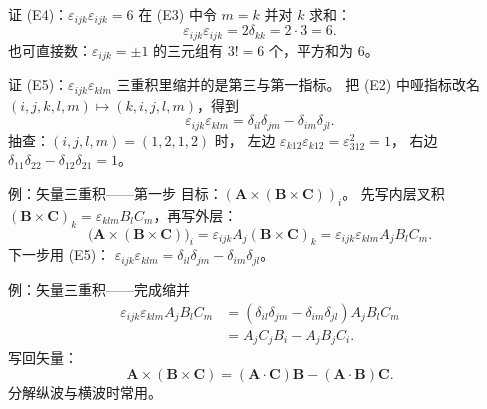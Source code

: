 \documentclass[fontset=windows, chinese, 10pt, xcolor=dvipsnames]{beamer}
\begin{document}
\begin{frame}{证 (E4)：$\varepsilon_{ijk}\varepsilon_{ijk}=6$}
  在 (E3) 中令 $m=k$ 并对 $k$ 求和：
  \begin{equation*}
    \varepsilon_{ijk}\varepsilon_{ijk}
    =2\delta_{kk}
    =2\cdot 3
    =6.
  \end{equation*}
  也可直接数：$\varepsilon_{ijk}=\pm 1$ 的三元组有 $3!=6$ 个，平方和为 $6$。
\end{frame}

\begin{frame}{证 (E5)：$\varepsilon_{ijk}\varepsilon_{klm}$}
  三重积里缩并的是第三与第一指标。
  把 (E2) 中哑指标改名
  $(i,j,k,l,m)\mapsto(k,i,j,l,m)$，得到
  \begin{equation*}
    \varepsilon_{ijk}\varepsilon_{klm}
    =\delta_{il}\delta_{jm}-\delta_{im}\delta_{jl}.
  \end{equation*}
  抽查：$(i,j,l,m)=(1,2,1,2)$ 时，
  左边 $\varepsilon_{k12}\varepsilon_{k12}=\varepsilon_{312}^2=1$，
  右边 $\delta_{11}\delta_{22}-\delta_{12}\delta_{21}=1$。
\end{frame}

\begin{frame}{例：矢量三重积——第一步}
  目标：$(\mathbf{A}\times(\mathbf{B}\times\mathbf{C}))_i$。
  先写内层叉积 $(\mathbf{B}\times\mathbf{C})_k=\varepsilon_{klm}B_l C_m$，再写外层：
  \begin{equation*}
    \bigl(\mathbf{A}\times(\mathbf{B}\times\mathbf{C})\bigr)_i
    =\varepsilon_{ijk}A_j(\mathbf{B}\times\mathbf{C})_k
    =\varepsilon_{ijk}\varepsilon_{klm}A_j B_l C_m.
  \end{equation*}
  下一步用 (E5)：
  $\varepsilon_{ijk}\varepsilon_{klm}=\delta_{il}\delta_{jm}-\delta_{im}\delta_{jl}$。
\end{frame}

\begin{frame}{例：矢量三重积——完成缩并}
  \begin{align*}
    \varepsilon_{ijk}\varepsilon_{klm}A_j B_l C_m
    &=(\delta_{il}\delta_{jm}-\delta_{im}\delta_{jl})A_j B_l C_m \\
    &=A_j C_j B_i-A_j B_j C_i.
  \end{align*}
  写回矢量：
  \begin{equation*}
    \boxed{\mathbf{A}\times(\mathbf{B}\times\mathbf{C})
    =(\mathbf{A}\cdot\mathbf{C})\mathbf{B}
    -(\mathbf{A}\cdot\mathbf{B})\mathbf{C}.}
  \end{equation*}
  分解纵波与横波时常用。
\end{frame}
\end{document}
